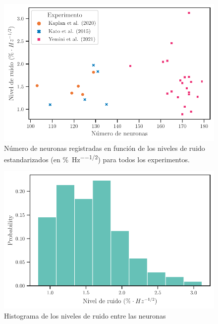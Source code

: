     \begin{figure}[h!]
	\centering{}\includegraphics[width=\imsize]{nivel_ruido.pdf}
	\caption[Número de neuronas registradas en función de los niveles de ruido estandarizados.]{Número de neuronas registradas en función de los niveles de ruido estandarizados (en \unit{\percent \per\hertz^{-1/2}}) para todos los experimentos.}\label{f:nivel_ruido}  
\end{figure}



    \begin{figure}[h!]
	\centering{}\includegraphics[width=\imsize]{histograma_ruido.pdf}
	\caption[Histograma de los niveles de ruido entre las neuronas]{Histograma de los niveles de ruido entre las neuronas
}\label{f:histruido}  
\end{figure}

